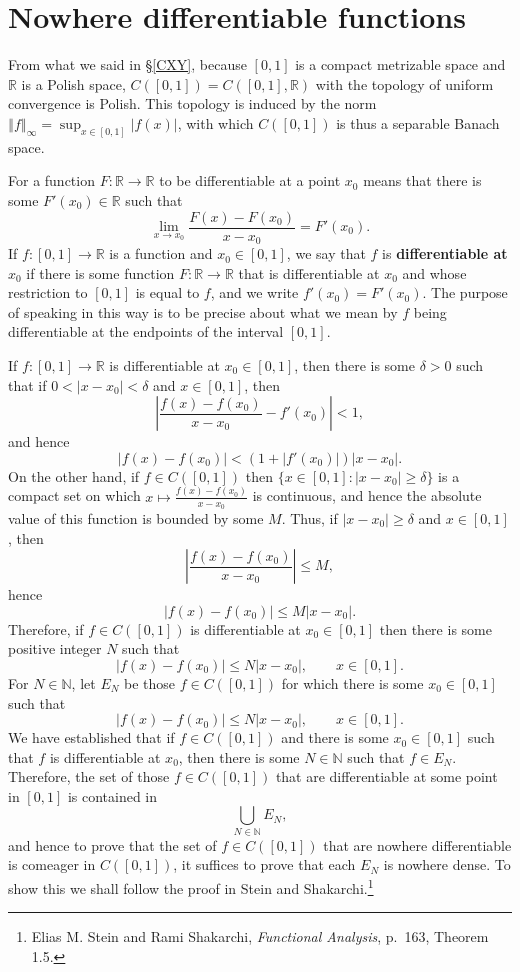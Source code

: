 \documentclass{article}
\newcommand{\norm}[1]{\left\Vert #1 \right\Vert}
\theoremstyle{definition}
\begin{document}
\section{Nowhere differentiable functions}
From what we said in \S \ref{CXY},
because $[0,1]$ is a compact metrizable space and $\mathbb{R}$ is a Polish space, $C([0,1])=
C([0,1],\mathbb{R})$ with the topology of uniform convergence is Polish. This topology is induced by the norm $\norm{f}_\infty = \sup_{x \in [0,1]} |f(x)|$,
with which $C([0,1])$ is thus a separable Banach space.

For a function $F:\mathbb{R} \to \mathbb{R}$ to be differentiable at a point $x_0$ means that
there is some $F'(x_0) \in \mathbb{R}$ such that
\[
\lim_{x \to x_0} \frac{F(x)-F(x_0)}{x-x_0} = F'(x_0).
\]
If $f:[0,1] \to \mathbb{R}$ is a function and $x_0 \in [0,1]$, we say that $f$ is \textbf{differentiable at $x_0$} if there is some function $F:\mathbb{R} \to \mathbb{R}$ that
is differentiable at $x_0$ and whose restriction to $[0,1]$ is equal to $f$, and we write $f'(x_0)=F'(x_0)$. The purpose of speaking in this way 
is to be precise about what we mean by $f$ being differentiable at the endpoints of the interval $[0,1]$. 

If $f:[0,1] \to \mathbb{R}$ is differentiable at $x_0 \in [0,1]$, then there is some $\delta>0$ such that if $0<|x-x_0| < \delta$ and $x \in [0,1]$, then
\[
\left|\frac{f(x)-f(x_0)}{x-x_0} - f'(x_0)\right|<1,
\]
and hence
\[
|f(x)-f(x_0)|< (1+|f'(x_0)|)|x-x_0|.
\]
On the other hand, if $f \in C([0,1])$ then $\{x \in [0,1]: |x-x_0| \geq \delta\}$ is a compact set on which $x \mapsto \frac{f(x)-f(x_0)}{x-x_0}$ is continuous, and hence the absolute value of this
function is bounded
by some $M$. Thus, if $|x-x_0| \geq \delta$ and $x \in [0,1]$, then
\[
\left|\frac{f(x)-f(x_0)}{x-x_0} \right| \leq M,
\]
hence
\[
|f(x)-f(x_0)| \leq M|x-x_0|.
\]
Therefore, if $f \in C([0,1])$ is differentiable at $x_0 \in [0,1]$ then there is some positive integer $N$ such that
\[
|f(x)-f(x_0)| \leq N|x-x_0|, \qquad x \in [0,1].
\]
For $N \in \mathbb{N}$, let $E_N$ be those $f \in C([0,1])$ for which there is some $x_0 \in [0,1]$ such that
\[
|f(x)-f(x_0)| \leq N|x-x_0|, \qquad x \in [0,1].
\]
We have established that if $f \in C([0,1])$ and there is some $x_0 \in [0,1]$ such that $f$ is differentiable at $x_0$, then
there is some $N \in \mathbb{N}$ such that $f \in E_N$. 
Therefore, the set of those $f \in C([0,1])$ that are differentiable at some point in $[0,1]$ is contained in 
\[
\bigcup_{N \in \mathbb{N}} E_N,
\]
and hence to prove that the set of $f \in C([0,1])$ that are nowhere differentiable is comeager in $C([0,1])$, it suffices to prove
that each $E_N$ is nowhere dense.
To show this we shall follow the proof in Stein and Shakarchi.\footnote{Elias M. Stein and Rami Shakarchi, {\em Functional Analysis}, p.~163, Theorem 1.5.} 
\end{document}
